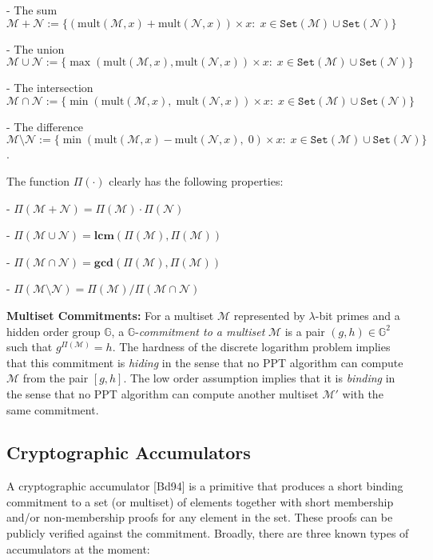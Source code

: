 \documentclass[11pt, lettersize, notitlepage, leqno, footskip=0.6cm]{article}
\newcommand{\ttt}{\texttt}
\newcommand{\bG}{\mathbb{G}}
\newcommand{\sett}{\ttt{Set}}
\newcommand{\mul}{\mr{mult}}
\newcommand{\mc}{\mathcal}
\newcommand{\mbf}{\mathbf}
\newcommand{\mr}{\mathrm}
\newcommand{\sm}{\setminus}
\newcommand{\lam}{\lambda}
\newcommand{\mcM}{\mc{M}}
\newcommand{\noin}{\noindent}
\newcommand{\LCM}{\mbf{lcm}}
\newcommand{\GCD}{\mbf{gcd}}
\numberwithin{equation}{section}
\begin{document}
\noin - The sum $\mc{M}+\mc{N} := \{(\mul(\mc{M},x)+\mul(\mc{N},x))\times x:\;x\in \sett(\mc{M})\cup\sett(\mc{N}) \}$

\noin - The union $\mc{M}\cup \mc{N} := \{\max(\mul(\mc{M},x),\mul(\mc{N},x))\times x:\;x\in \sett(\mc{M})\cup\sett(\mc{N})\}$

\noin - The intersection $\mc{M}\cap \mc{N} := \{\min(\mul(\mc{M},x),\;\mul(\mc{N},x))\times x:\;x\in \sett(\mc{M})\cup\sett(\mc{N})\}$

\noin - The difference $\mc{M}\sm \mc{N} := \{\min(\mul(\mc{M},x)-\mul(\mc{N},x),\; 0)\times x:\;x\in \sett(\mc{M})\cup\sett(\mc{N})\}$.\vspace{0.1cm}

\noin The function $\Pi(\cdot)$ clearly has the following properties:\vspace{0.05cm}

\noin- $\Pi(\mc{M}+\mc{N})= \Pi(\mc{M})\cdot\Pi(\mc{N})$

\noin - $\Pi(\mc{M}\cup \mc{N}) = \LCM(\Pi(\mc{M}), \Pi(\mc{M}))$

\noin - $\Pi(\mc{M}\cap \mc{N}) = \GCD(\Pi(\mc{M}), \Pi(\mc{M}))$

\noin - $\Pi(\mc{M}\sm \mc{N}) = {\Pi(\mc{M})}/{\Pi(\mc{M}\cap \mc{N})}$\vspace{0.2cm}

\noin \textbf{Multiset Commitments:} For a multiset $\mc{M}$ represented by $\lam$-bit primes and a hidden order group $\bG$, a $\bG$-\textit{commitment to a multiset} $\mc{M}$ is a pair $(g, h)\in\bG^2$ such that $g^{\Pi(\mc{M})} = h$. The hardness of the discrete logarithm problem implies that this commitment is \textit{hiding} in the sense that no PPT algorithm can compute $\mcM$ from the pair $[g,h]$. The low order assumption implies that it is \textit{binding} in the sense that no PPT algorithm can compute another multiset $\mcM'$ with the same commitment.

\subsection{\fontsize{11}{11}\selectfont Cryptographic Accumulators }

A cryptographic accumulator [Bd94] is a primitive that produces a short binding commitment to a set (or multiset) of elements together with short membership and/or non-membership proofs for any element in the set. These proofs can be publicly verified against the commitment. Broadly, there are three known types of accumulators at the moment: 
\end{document}

